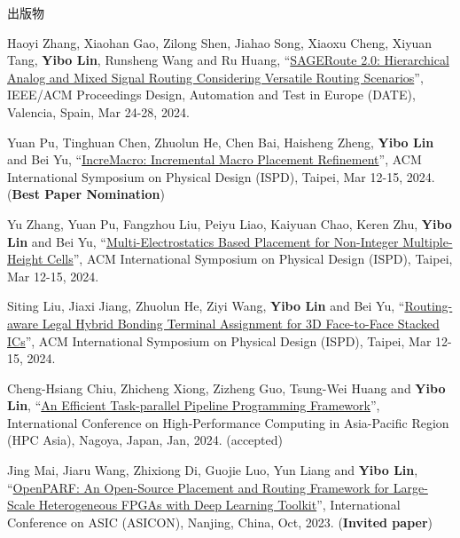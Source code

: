 \begin{rSection}{出版物}
\begin{description}[font=\normalfont, rightmargin=2em]
{}
            

\item[{[C91]}]{
        Haoyi Zhang, Xiaohan Gao, Zilong Shen, Jiahao Song, Xiaoxu Cheng, Xiyuan Tang, \textbf{Yibo Lin}, Runsheng Wang and Ru Huang, 
    ``\href{https://ieeexplore.ieee.org/document/10546542}{SAGERoute 2.0: Hierarchical Analog and Mixed Signal Routing Considering Versatile Routing Scenarios}'', 
    IEEE/ACM Proceedings Design, Automation and Test in Europe (DATE), Valencia, Spain, Mar 24-28, 2024.
    
}
            

\item[{[C90]}]{
        Yuan Pu, Tinghuan Chen, Zhuolun He, Chen Bai, Haisheng Zheng, \textbf{Yibo Lin} and Bei Yu, 
    ``\href{https://doi.org/10.1145/3626184.3633321}{IncreMacro: Incremental Macro Placement Refinement}'', 
    ACM International Symposium on Physical Design (ISPD), Taipei, Mar 12-15, 2024.
    (\textbf{Best Paper Nomination})
}
            

\item[{[C89]}]{
        Yu Zhang, Yuan Pu, Fangzhou Liu, Peiyu Liao, Kaiyuan Chao, Keren Zhu, \textbf{Yibo Lin} and Bei Yu, 
    ``\href{https://doi.org/10.1145/3626184.3633320}{Multi-Electrostatics Based Placement for Non-Integer Multiple-Height Cells}'', 
    ACM International Symposium on Physical Design (ISPD), Taipei, Mar 12-15, 2024.
    
}
            

\item[{[C88]}]{
        Siting Liu, Jiaxi Jiang, Zhuolun He, Ziyi Wang, \textbf{Yibo Lin} and Bei Yu, 
    ``\href{https://doi.org/10.1145/3626184.3633322}{Routing-aware Legal Hybrid Bonding Terminal Assignment for 3D Face-to-Face Stacked ICs}'', 
    ACM International Symposium on Physical Design (ISPD), Taipei, Mar 12-15, 2024.
    
}
            

\item[{[C87]}]{
        Cheng-Hsiang Chiu, Zhicheng Xiong, Zizheng Guo, Tsung-Wei Huang and \textbf{Yibo Lin}, 
    ``\href{https://doi.org/10.1145/3635035.3635037}{An Efficient Task-parallel Pipeline Programming Framework}'', 
    International Conference on High-Performance Computing in Asia-Pacific Region (HPC Asia), Nagoya, Japan, Jan, 2024.
    (accepted)
}
            

\item[{[C86]}]{
        Jing Mai, Jiaru Wang, Zhixiong Di, Guojie Luo, Yun Liang and \textbf{Yibo Lin}, 
    ``\href{https://arxiv.org/abs/2306.16665}{OpenPARF: An Open-Source Placement and Routing Framework for Large-Scale Heterogeneous FPGAs with Deep Learning Toolkit}'', 
    International Conference on ASIC (ASICON), Nanjing, China, Oct, 2023.
    (\textbf{Invited paper})
}
            


\end{description}
\end{rSection}
